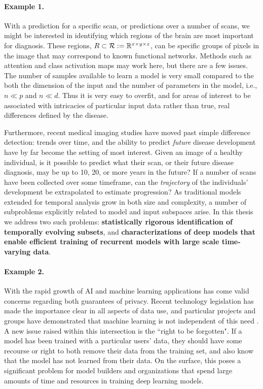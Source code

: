 \paragraph{Example 1.}
With a prediction for a specific scan, or predictions over a number of scans, we might be interested in identifying which regions of the brain are most important for diagnosis. These regions, $R \subset \mathcal{R}:=\mathbb{R}^{x\times y\times z}$, can be specific groups of pixels in the image that may correspond to known functional networks. Methods such as attention and class activation maps may work here, but there are a few issues. The number of samples available to learn a model is very small compared to the both the dimension of the input and the number of parameters in the model, i.e., $n \ll p$ and $n \ll d$. Thus it is very easy to overfit, and for areas of interest to be associated with intricacies of particular input data rather than true, real differences defined by the disease.

Furthermore, recent medical imaging studies have moved past simple difference detection: trends over time, and the ability to predict {\em future} disease development have by far become the setting of most interest.
Given an image of a healthy individual, is it possible to predict what their scan, or their future disease diagnosis, may be up to 10, 20, or more years in the future?
If a number of scans have been collected over some timeframe, can the \textit{trajectory} of the individuals' development be extrapolated to estimate progression?
As traditional models extended for temporal analysis grow in both size and complexity,
a number of subproblems explicitly related to model and input subspaces arise. In this thesis we address two such problems: \textbf{statistically rigorous identification of temporally evolving subsets}, and \textbf{characterizations of deep models that enable efficient training of recurrent models with large scale time-varying data}.
    
\paragraph{Example 2.}
With the rapid growth of AI and machine learning applications has come valid concerns regarding both guarantees of privacy.
Recent technology legislation has made the importance clear in all aspects of data use,
and particular projects and groups have demonstrated that machine learning is not independent of
this need \citep{Exposing}.
A new issue raised within this intersection is the ``right to be forgotten".
If a model has been trained with a particular users' data, 
they should have some recourse or right
to both remove their data from the training set,
and also know that the model has not learned from their data.
On the surface, this poses a significant problem for model builders
and organizations that spend large amounts
of time and resources in 
training deep learning models.

